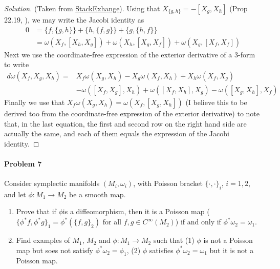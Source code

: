 \begin{proof}[Solution]\leavevmode
	(Taken from \href{https://math.stackexchange.com/questions/1692891/how-to-show-that-jacobi-identity-for-is-equivalent-to-omega-being-clo}{StackExhange}). Using that $X_{\{g,h\}} =-[X_g,X_h]$ (Prop 22.19, \cite{lee} ), we may write the Jacobi identity as
	\begin{align*}
		0&=\{f,\{g,h\}\}+\{h,\{f,g\}\} +\{g,\{h,f\}\} \\
		 &=\omega(X_f,[X_h,X_g])+\omega(X_h,[X_g,X_f])+\omega(X_g,[X_f,X_f])
	\end{align*}
	Next we use the coordinate-free expression of the exterior derivative of a 3-form to write
	\begin{align*}
		d\omega(X_f,X_g,X_h)=&X_f\omega(X_g,X_h)-X_g\omega(X_f,X_h)+X_h\omega(X_f,X_g)\\
				     &-\omega([X_f,X_g],X_h)+\omega([X_f,X_h],X_g)-\omega([X_g,X_h],X_f)
	\end{align*}
	Finally we use that $X_f\omega(X_g,X_h)=\omega(X_f,[X_g,X_h])$ (I believe this to be derived too from the coordinate-free expression of the exterior derivative) to note that, in the last equation, the first and second row on the right hand side are actually the same, and each of them equals the expression of the Jacobi identity.
\end{proof}

\paragraph{Problem 7} Consider symplectic manifolds $(M_i,\omega_i)$, with Poisson bracket $\{\cdot ,\cdot \}_{i}$, $i=1,2$, and let  $\phi:M_1\to M_2$ be a smooth map.
\begin{enumerate}[label=\alph*.]
	\item Prove that if $\phi$is a diffeomorphism, then it is a Poisson map ($\{\phi^*f,\phi^*g\}_1=\phi^* (\{f,g\}_2)$ for all $f,g\in C^\infty(M_2)$) if and only if $\phi^*\omega_2=\omega_1$.

	\item Find examples of $M_1$, $M_2$ and $\phi:M_1\to M_2$ such that (1) $\phi$ is not a Poisson map but soes not satisfy $\phi^*\omega_2=\phi_1$, (2) $\phi$ satisfies $\phi^*\omega_2=\omega_1$ but it is not a Poisson map.
\end{enumerate}

